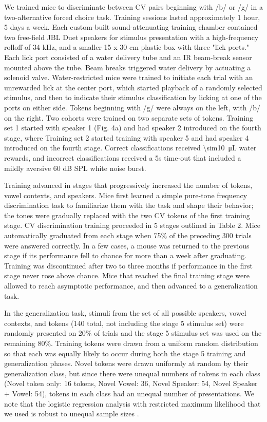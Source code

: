 We trained mice to discriminate between CV pairs beginning with /b/ or /g/ in a two-alternative forced choice task. Training sessions lasted approximately 1 hour, 5 days a week. Each custom-built sound-attenuating training chamber contained two free-field JBL Duet speakers for stimulus presentation with a high-frequency rolloff of 34 kHz, and a smaller 15 x 30 cm plastic box with three "lick ports." Each lick port consisted of a water delivery tube and an IR beam-break sensor mounted above the tube. Beam breaks triggered water delivery by actuating a solenoid valve. Water-restricted mice were trained to initiate each trial with an unrewarded lick at the center port, which started playback of a randomly selected stimulus, and then to indicate their stimulus classification by licking at one of the ports on either side. Tokens beginning with /g/ were always on the left, with /b/ on the right. Two cohorts were trained on two separate sets of tokens. Training set 1 started with speaker 1 (Fig. 4a) and had speaker 2 introduced on the fourth stage, where Training set 2 started training with speaker 5 and had speaker 4 introduced on the fourth stage. Correct classifications received \SI{\sim10}{\micro\liter} water rewards, and incorrect classifications received a 5s time-out that included a mildly aversive 60 dB SPL white noise burst.

Training advanced in stages that progressively increased the number of tokens, vowel contexts, and speakers. Mice first learned a simple pure-tone frequency discrimination task to familiarize them with the task and shape their behavior; the tones were gradually replaced with the two CV tokens of the first training stage. CV discrimination training proceeded in 5 stages outlined in Table 2. Mice automatically graduated from each stage when 75\% of the preceding 300 trials were answered correctly. In a few cases, a mouse was returned to the previous stage if its performance fell to chance for more than a week after graduating. Training was discontinued after two to three months if performance in the first stage never rose above chance. Mice that reached the final training stage were allowed to reach asymptotic performance, and then advanced to a generalization task.%

In the generalization task, stimuli from the set of all possible speakers, vowel contexts, and tokens (140 total, not including the stage 5 stimulus set) were randomly presented on 20\% of trials and the stage 5 stimulus set was used on the remaining 80\%. Training tokens were drawn from a uniform random distribution so that each was equally likely to occur during both the stage 5 training and generalization phases. Novel tokens were drawn uniformly at random by their generalization class, but since there were unequal numbers of tokens in each class (Novel token only: 16 tokens, Novel Vowel: 36, Novel Speaker: 54, Novel Speaker + Vowel: 54), tokens in each class had an unequal number of presentations. We note that the logistic regression analysis with restricted maximum likelihood that we used is robust to unequal sample sizes \citep{Patterson1971}.

